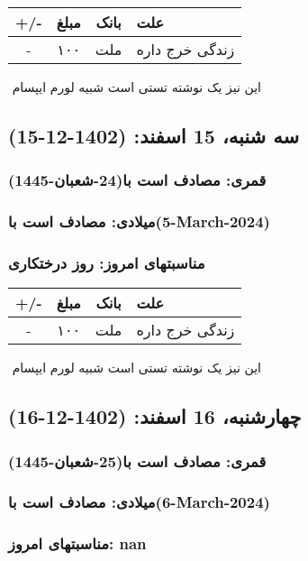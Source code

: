 \documentclass{article}
\newcommand{\rnote}[1]{\marginpar{\textcolor{color}{\StrSubstitute{\##1}{ }{\_}}}}
\newcommand{\myRow}[4]{
    #1 & #2 & #3 & #4 \\ \hline
}
\begin{document}
\begin{tabular}{ | c | c | c | p{5cm} |}
    \hline
    \myRow{ +/- }{مبلغ}{بانک}{علت}
    \myRow{-}{۱۰۰}{ملت}{زندگی خرج داره}
\end{tabular}
\newline
\newline

‌
\rnote{تست}
این نیز یک نوشته تستی است شبیه لورم ایپسام




\newpage
{}
\textcolor{color}{
\section{ سه شنبه، 15 اسفند: (1402-12-15) }
\subsubsection*{قمری: مصادف است با(24-شعبان-1445)} 
\subsubsection*{میلادی: مصادف است با(5-March-2024)}
\subsubsection*{مناسبتهای امروز: روز درختکاری}
}


\begin{tabular}{ | c | c | c | p{5cm} |}
    \hline
    \myRow{ +/- }{مبلغ}{بانک}{علت}
    \myRow{-}{۱۰۰}{ملت}{زندگی خرج داره}
\end{tabular}
\newline
\newline

‌
\rnote{تست}
این نیز یک نوشته تستی است شبیه لورم ایپسام




\newpage
{}
\textcolor{color}{
\section{ چهارشنبه، 16 اسفند: (1402-12-16) }
\subsubsection*{قمری: مصادف است با(25-شعبان-1445)} 
\subsubsection*{میلادی: مصادف است با(6-March-2024)}
\subsubsection*{مناسبتهای امروز: nan}
}
\end{document}
